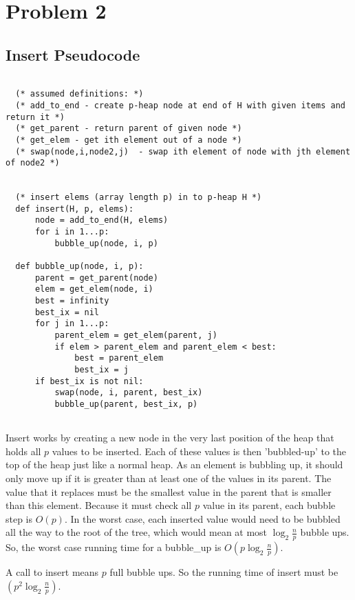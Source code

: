 \documentclass[a4paper,12pt]{article}
\begin{document}
\pagebreak

\section*{Problem 2}

\subsection*{Insert Pseudocode}


\begin{verbatim}

  (* assumed definitions: *)
  (* add_to_end - create p-heap node at end of H with given items and return it *)
  (* get_parent - return parent of given node *)
  (* get_elem - get ith element out of a node *)
  (* swap(node,i,node2,j)  - swap ith element of node with jth element of node2 *)


  (* insert elems (array length p) in to p-heap H *)
  def insert(H, p, elems):
      node = add_to_end(H, elems)
      for i in 1...p:
          bubble_up(node, i, p)

  def bubble_up(node, i, p):
      parent = get_parent(node)
      elem = get_elem(node, i)
      best = infinity
      best_ix = nil
      for j in 1...p:
          parent_elem = get_elem(parent, j)
          if elem > parent_elem and parent_elem < best:
              best = parent_elem
              best_ix = j
      if best_ix is not nil:
          swap(node, i, parent, best_ix)
          bubble_up(parent, best_ix, p)
          
\end{verbatim}

Insert works by creating a new node in the very last position of the
heap that holds all $p$ values to be inserted. Each of these values is
then 'bubbled-up' to the top of the heap just like a normal heap. As
an element is bubbling up, it should only move up if it is greater
than at least one of the values in its parent. The value that it
replaces must be the smallest value in the parent that is smaller than
this element. Because it must check all $p$ value in its parent, each
bubble step is $O(p)$. In the worst case, each inserted value would
need to be bubbled all the way to the root of the tree, which would
mean at most $\log_2 \frac{n}{p}$ bubble ups. So, the worst case
running time for a bubble\_up is $O(p\log_2 \frac{n}{p})$.


A call to insert means $p$ full bubble ups. So the running time of
insert must be $(p^2\log_2 \frac{n}{p})$.
\end{document}
